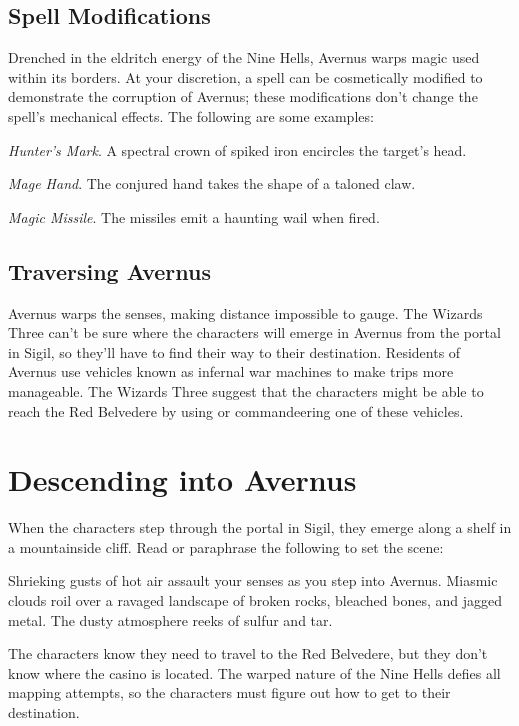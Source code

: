\documentclass[10pt,a4paper,twoside,bg=print,twocolumn,openany,nodeprecatedcode]{dndbook}
\begin{document}
\subsection{Spell Modifications}
Drenched in the eldritch energy of the Nine Hells, Avernus warps magic used within its borders. At your discretion, a spell can be cosmetically modified to demonstrate the corruption of Avernus; these modifications don't change the spell's mechanical effects. The following are some examples:

\textit{Hunter's Mark}. A spectral crown of spiked iron encircles the target's head.

\textit{Mage Hand}. The conjured hand takes the shape of a taloned claw.

\textit{Magic Missile}. The missiles emit a haunting wail when fired.

\subsection{Traversing Avernus}
Avernus warps the senses, making distance impossible to gauge. The Wizards Three can't be sure where the characters will emerge in Avernus from the portal in Sigil, so they'll have to find their way to their destination. Residents of Avernus use vehicles known as infernal war machines to make trips more manageable. The Wizards Three suggest that the characters might be able to reach the Red Belvedere by using or commandeering one of these vehicles.

\section{Descending into Avernus}
When the characters step through the portal in Sigil, they emerge along a shelf in a mountainside cliff. Read or paraphrase the following to set the scene:

\begin{DndReadAloud}{}
Shrieking gusts of hot air assault your senses as you step into Avernus. Miasmic clouds roil over a ravaged landscape of broken rocks, bleached bones, and jagged metal. The dusty atmosphere reeks of sulfur and tar.

\end{DndReadAloud}

The characters know they need to travel to the Red Belvedere, but they don't know where the casino is located. The warped nature of the Nine Hells defies all mapping attempts, so the characters must figure out how to get to their destination.
\end{document}
